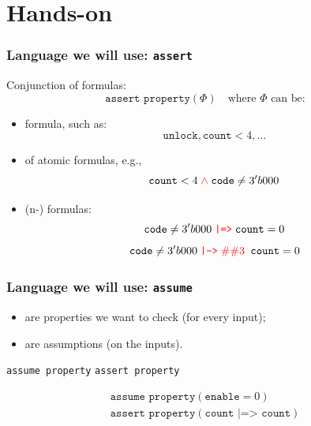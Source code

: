 \documentclass[usenames,dvipsnames]{beamer}
\begin{document}
\section{Hands-on}

\begin{frame}
  \frametitle{Language we will use: \texttt{assert}}
  
  Conjunction of  formulas:
  \[ \texttt{assert property} (\Phi) \quad \text{where $\Phi$ can be:} \] \pause
   \begin{itemize}
  \item {} formula, such as: 
   \[ \texttt{unlock}, \texttt{count} < 4, ...  \]
  \item \pause {} of atomic formulas, e.g.,
  \[ \texttt{count} < 4 \; \tc{red}{\land} \; \texttt{code} \not = 3'b000  \]
  \item \pause (n-) formulas:
  \[ \texttt{code} \not = 3'b000 \; \tc{red}{\texttt{|=>}} \; \texttt{count} = 0 \]
    \[ \texttt{code} \not = 3'b000 \; \tc{red}{\texttt{|->} \; \#\#3} \texttt{ count} = 0 \]
\end{itemize}
\end{frame}


\begin{frame}
  \frametitle{Language we will use: \texttt{assume}}
  
 \begin{itemize}
  \item {} are properties we want to check (for every input);
  \item {} are assumptions (on the inputs).
\end{itemize}

\vfill

\begin{center}
	\texttt{assume property}  \texttt{assert property}

\vfill \pause

\[ \begin{array}{l}
 	\texttt{assume property} (\texttt{enable} = 0) \\
\texttt{assert property} (\texttt{count |=> count})
 \end{array} \]

\end{center}
  
  
\end{frame}
\end{document}

